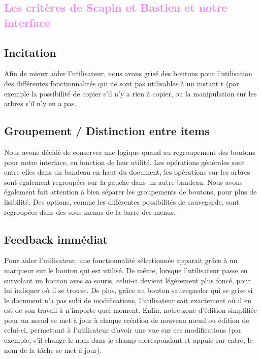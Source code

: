 \documentclass[12pt, a4paper]{article}
\begin{document}
\textcolor{Violet}{\section{Les critères de Scapin et Bastien et notre interface}}

\textcolor{NavyBlue}{\subsection{Incitation}}

Afin de mieux aider l'utilisateur, nous avons grisé des boutons pour l'utilisation des différentes fonctionnalités qui ne sont pas utilisables à un instant t (par exemple la possibilité de copier s’il n'y a rien à copier, ou la manipulation sur les arbres s’il n'y en a pas. 

\textcolor{NavyBlue}{\subsection{Groupement / Distinction entre items}}

Nous avons décidé de conserver une logique quand au regroupement des boutons pour notre interface, en fonction de leur utilité. Les opérations générales sont entre elles dans un bandeau en haut du document, les opérations sur les arbres sont également regroupées sur la gauche dans un autre bandeau. Nous avons également fait attention à bien séparer les groupements de boutons, pour plus de lisibilité. Des options, comme les différentes possibilités de sauvegarde, sont regroupées dans des sous-menus de la barre des menus.

\textcolor{NavyBlue}{\subsection{Feedback immédiat}}

Pour aider l'utilisateur, une fonctionnalité sélectionnée apparait grâce à un marqueur sur le bouton qui est utilisé. De même, lorsque l'utilisateur passe en survolant un bouton avec sa souris, celui-ci devient légèrement plus foncé, pour lui indiquer où il se trouve. De plus, grâce au bouton sauvegarder qui se grise si le document n'a pas subi de modifications, l'utilisateur sait exactement où il en est de son travail à n'importe quel moment. Enfin, notre zone d'édition simplifiée pour un nœud se met à jour à chaque création de nouveau nœud ou édition de celui-ci, permettant à l'utilisateur d'avoir une vue sur ces modifications (par exemple, s’il change le nom dans le champ correspondant et appuie sur entré, le nom de la tâche se met à jour).
\end{document}
